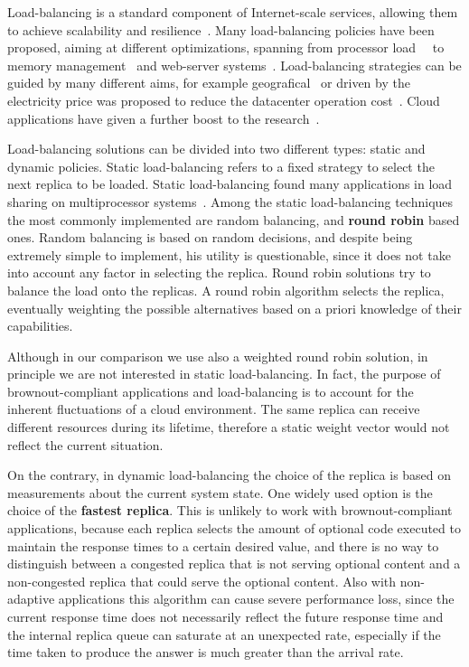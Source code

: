Load-balancing is a standard component of Internet-scale services,
allowing them to achieve scalability and
resilience~\citep{Barroso09,Hamilton07:LISA}.  Many load-balancing
policies have been proposed, aiming at different optimizations,
spanning from processor load~~\cite{Stankovic:TC} to memory
management~\cite{PattersonMemoryLB,MemoryLBACC} and web-server
systems~\cite{Cardellini2003}. Load-balancing strategies can be guided
by many different aims, for example geografical~\cite{GeograficalSASO}
or driven by the electricity price was proposed to reduce the
datacenter operation
cost~\cite{LoadBalancingForElectricity:TCC}. Cloud applications have
given a further boost to the
research~\citep{Barroso09,Lu11:PerfEval,Lin12:IGCC}.


Load-balancing solutions can be divided into two different types:
static and dynamic policies. Static load-balancing refers to a fixed
strategy to select the next replica to be loaded. Static
load-balancing found many applications in load sharing on
multiprocessor
systems~\cite{StaticLoadBalancing:TSE,StaticOptimal:ACM}. Among the
static load-balancing techniques the most commonly implemented are
random balancing, and \textbf{round robin} based ones. Random
balancing is based on random decisions, and despite being extremely
simple to implement, his utility is questionable, since it does not
take into account any factor in selecting the replica. Round robin
solutions try to balance the load onto the replicas. A round robin
algorithm selects the replica, eventually weighting the possible
alternatives based on a priori knowledge of their capabilities.

Although in our comparison we use also a weighted round robin
solution, in principle we are not interested in static
load-balancing. In fact, the purpose of brownout-compliant
applications and load-balancing is to account for the inherent
fluctuations of a cloud environment. The same replica can receive
different resources during its lifetime, therefore a static weight
vector would not reflect the current situation.

On the contrary, in dynamic load-balancing the choice of the replica
is based on measurements about the current system state. One widely
used option is the choice of the \textbf{fastest replica}. This is
unlikely to work with brownout-compliant applications, because each
replica selects the amount of optional code executed to maintain the
response times to a certain desired value, and there is no way to
distinguish between a congested replica that is not serving optional
content and a non-congested replica that could serve the optional
content. Also with non-adaptive applications this algorithm can cause
severe performance loss, since the current response time does not
necessarily reflect the future response time and the internal replica
queue can saturate at an unexpected rate, especially if the time taken
to produce the answer is much greater than the arrival rate.

